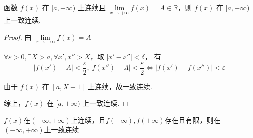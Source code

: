 \begin{corollary}
	函数 \( f(x) \) 在 \([a, +\infty)\) 上连续且 \(\lim\limits_{x \to +\infty} f(x) = A \in \mathbb{R}\)，则 \( f(x) \) 在 \([a, +\infty)\) 上一致连续.
	
\end{corollary}
\begin{proof}
	由 \(\lim\limits_{x \to +\infty} f(x) = A\)
	
	\(\forall \varepsilon > 0, \exists X > a, \forall x', x'' > X\)，取 \(|x' - x''| < \delta\)，
	有 
	$$|f(x') - A| < \dfrac{\varepsilon}{2},|f(x'') - A| < \dfrac{\varepsilon}{2}\Leftrightarrow|f(x') - f(x'')| < \varepsilon$$
	
	由于 \(f(x)\) 在 \([a, X+ 1]\) 上连续，故一致连续.
	
	综上，\(f(x)\) 在 \([a, +\infty)\) 上一致连续.
\end{proof}
\begin{corollary}
	$f(x)$在$(-\infty,+\infty)$上连续，且$f(-\infty),f(+\infty)$存在且有限，则在$(-\infty,+\infty)$上一致连续
\end{corollary}
































